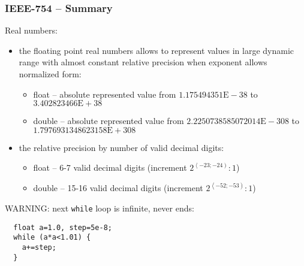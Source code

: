 \documentclass{beamer}
\begin{document}
\begin{frame}[fragile]
\frametitle{IEEE-754 -- Summary}

Real numbers:
\begin{itemize}
\item the floating point real numbers allows to represent values in large dynamic range with almost constant relative precision when exponent allows normalized form:
\begin{itemize}
\item float -- absolute represented value from $1.175494351\text{E}-38$ to $3.402823466\text{E} + 38$
\item double -- absolute represented value from $2.2250738585072014\text{E} - 308$ to $1.7976931348623158\text{E} + 308$
\end{itemize}
\item the relative precision by number of valid decimal digits:
\begin{itemize}
\item float --  6-7 valid decimal digits (increment $2^{\left\langle -23; -24\right)} : 1$)
\item double -- 15-16 valid decimal digits (increment $2^{\left\langle -52; -53\right)} : 1$)
\end{itemize}
\end{itemize}

WARNING: next \texttt{while} loop is infinite, never ends:
\begin{verbatim}
  float a=1.0, step=5e-8;
  while (a*a<1.01) {
    a+=step;
  }
\end{verbatim}
\end{frame}
\end{document}
